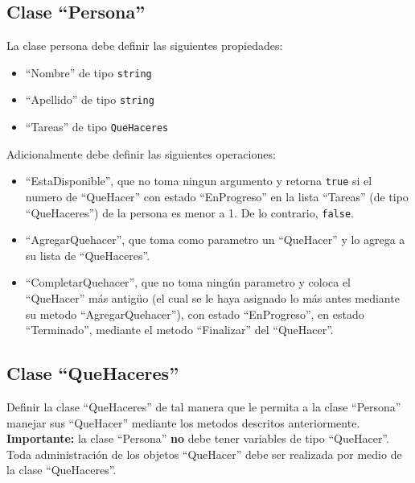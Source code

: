 \documentclass{article}
\begin{document}
\subsection*{Clase ``Persona''}
La clase persona debe definir las siguientes propiedades:
\begin{itemize}
        \item{``Nombre'' de tipo \texttt{string}}
        \item{``Apellido'' de tipo \texttt{string}}
        \item{``Tareas'' de tipo \texttt{QueHaceres}}
\end{itemize}

Adicionalmente debe definir las siguientes operaciones:
\begin{itemize}
        \item{``EstaDisponible'', que no toma ningun argumento y retorna \texttt{true}
                si el numero de ``QueHacer'' con estado ``EnProgreso'' en la lista
                ``Tareas'' (de tipo ``QueHaceres'') de la persona es menor a 1.
                De lo contrario, \texttt{false}.}
        \item{``AgregarQuehacer'', que toma como parametro un ``QueHacer'' y lo agrega a su
                lista de ``QueHaceres''}.
        \item{``CompletarQuehacer'', que no toma ning\'un parametro y coloca el ``QueHacer''
                m\'as antig\"uo (el cual se le haya asignado lo m\'as antes mediante
                su metodo ``AgregarQuehacer''), con estado ``EnProgreso'', en estado
                ``Terminado'', mediante el metodo ``Finalizar'' del ``QueHacer''.} 
\end{itemize}

\subsection*{Clase ``QueHaceres''}
Definir la clase ``QueHaceres'' de tal manera que le permita a la clase ``Persona''
manejar sus ``QueHacer'' mediante los metodos descritos anteriormente. {\bf Importante:}
la clase ``Persona'' {\bf no} debe tener variables de tipo ``QueHacer''. Toda administraci\'on
de los objetos ``QueHacer'' debe ser realizada por medio de la clase ``QueHaceres''.
\end{document}
